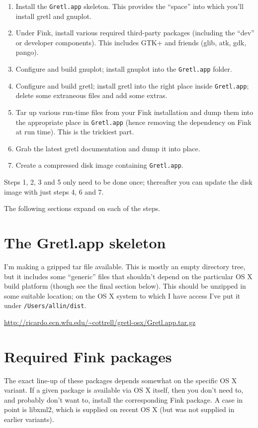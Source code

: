 \documentclass{article}
\begin{document}
\begin{enumerate}
\item Install the \texttt{Gretl.app} skeleton.  This provides the
  ``space'' into which you'll install gretl and gnuplot.
\item Under Fink, install various required third-party packages
  (including the ``dev'' or developer components).  This includes
  GTK+ and friends (glib, atk, gdk, pango).
\item Configure and build gnuplot; install gnuplot into
  the \texttt{Gretl.app} folder.
\item Configure and build gretl; install gretl into the right place
  inside \texttt{Gretl.app}; delete some extraneous files and add some
  extras.
\item Tar up various run-time files from your Fink installation and
  dump them into the appropriate place in \texttt{Gretl.app} (hence
  removing the dependency on Fink at run time).  This is the trickiest
  part.
\item Grab the latest gretl documentation and dump it into place.
\item Create a compressed disk image containing \texttt{Gretl.app}.
\end{enumerate}

Steps 1, 2, 3 and 5 only need to be done once; thereafter you can
update the disk image with just steps 4, 6 and 7.

The following sections expand on each of the steps.

\section{The Gretl.app skeleton}

I'm making a gzipped tar file available.  This is mostly an empty
directory tree, but it includes some ``generic'' files that shouldn't
depend on the particular OS X build platform (though see the final
section below).  This should be unzipped in some suitable location; on
the OS X system to which I have access I've put it under
\texttt{/Users/allin/dist}.

\url{http://ricardo.ecn.wfu.edu/~cottrell/gretl-osx/Gretl.app.tar.gz}

\section{Required Fink packages}

The exact line-up of these packages depends somewhat on the specific
OS X variant.  If a given package is available via OS X itself, then
you don't need to, and probably don't want to, install the
corresponding Fink package.  A case in point is libxml2, which is
supplied on recent OS X (but was not supplied in earlier variants).
\end{document}
